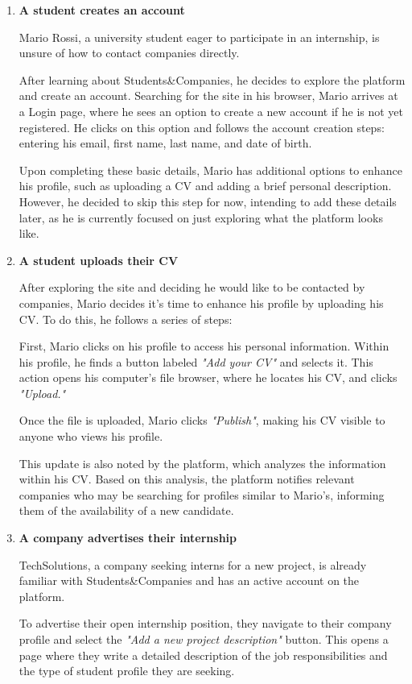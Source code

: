 \begin{enumerate} 
    \item \textbf{A student creates an account}

    Mario Rossi, a university student eager to participate in an internship, is unsure of how to contact companies directly. 
    
    After learning about Students\&Companies, he decides to explore the platform and create an account. Searching for the site in his browser, Mario arrives at a Login page, where he sees an option to create a new account if he is not yet registered. He clicks on this option and follows the account creation steps: entering his email, first name, last name, and date of birth.
    
    Upon completing these basic details, Mario has additional options to enhance his profile, such as uploading a CV and adding a brief personal description. However, he decided to skip this step for now, intending to add these details later, as he is currently focused on just exploring what the platform looks like.
    \item \textbf{A student uploads their CV}

    After exploring the site and deciding he would like to be contacted by companies, Mario decides it’s time to enhance his profile by uploading his CV. To do this, he follows a series of steps:

    First, Mario clicks on his profile to access his personal information. Within his profile, he finds a button labeled \textit{"Add your CV"} and selects it. This action opens his computer's file browser, where he locates his CV, and clicks \textit{"Upload."} 
    
    Once the file is uploaded, Mario clicks \textit{"Publish"}, making his CV visible to anyone who views his profile.

    This update is also noted by the platform, which analyzes the information within his CV. Based on this analysis, the platform notifies relevant companies who may be searching for profiles similar to Mario's, informing them of the availability of a new candidate.
    \item \textbf{A company advertises their internship}
    
    TechSolutions, a company seeking interns for a new project, is already familiar with Students\&Companies and has an active account on the platform.
    
    To advertise their open internship position, they navigate to their company profile and select the \textit{"Add a new project description" }button. This opens a page where they write a detailed description of the job responsibilities and the type of student profile they are seeking. 
    

\end{enumerate}
